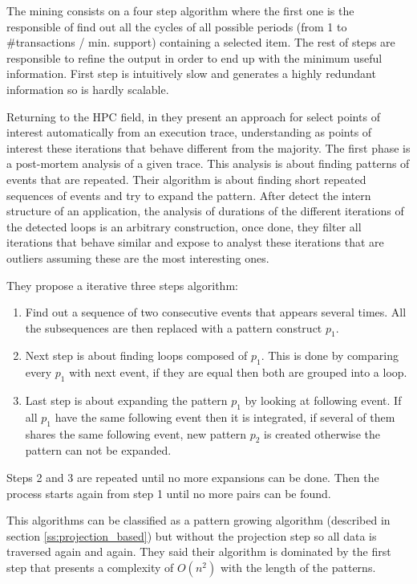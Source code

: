 The mining consists on a four step algorithm where the first one is the
responsible of find out all the cycles of all possible periods (from 1 to \#transactions / min. support) containing a selected item. The rest of steps are
responsible to refine the output in order to end up with the minimum useful
information. First step is intuitively slow and generates a highly redundant
information so is hardly scalable.


Returning to the HPC field, in \cite{trahay2015selecting} they present an 
approach for select points of
interest automatically from an execution trace, understanding as points of 
interest these iterations that
behave different from the majority. The first phase is a post-mortem analysis of
a given trace. This analysis is about finding patterns of events that are
repeated. Their algorithm is about finding short
repeated sequences of events and try to expand the pattern. After detect the
intern structure of an application, the analysis of durations of the
different iterations of the detected loops is an arbitrary construction, once
done, they filter all iterations that behave similar and
expose to analyst these iterations that are outliers assuming these are the
most interesting ones.

They propose a iterative three steps algorithm:
\begin{enumerate}[label=\roman*)]
  \item Find out a sequence of two consecutive events that appears several
    times. All the subsequences are then replaced with a pattern construct
    $p_{1}$.
  \item Next step is about finding loops composed of $p_{1}$. This is done by
    comparing every $p_{1}$ with next event, if they are equal then both are
    grouped into a loop.
  \item Last step is about expanding the pattern $p_{1}$ by looking at following
    event. If all $p_{1}$ have the same following event then it is integrated,
    if several of them shares the same following event, new pattern $p_{2}$ is
    created otherwise the pattern can not be expanded.
\end{enumerate}
Steps 2 and 3 are repeated until no more expansions can be done. Then the
process starts again from step 1 until no more pairs can be found.

This algorithms can be classified as a pattern growing algorithm (described in
section \ref{ss:projection_based}) but without the projection step so all data
is traversed again and again. They said their algorithm is dominated by the
first step that presents a complexity of $O(n^2)$ with the length of the
patterns.

